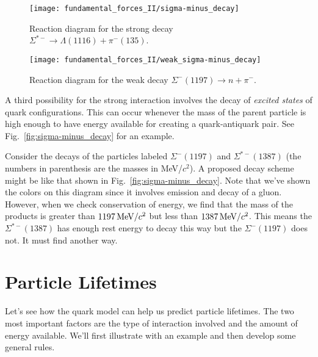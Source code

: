 \begin{figure}[tbp]
\begin{minipage}{6cm}
\begin{center}
\texttt{[image: fundamental\_forces\_II/sigma-minus\_decay]}
\caption{Reaction diagram for the strong decay $\Sigma^{\ast -} \to
  \Lambda(1116) + \pi^-(135)$.}
\label{fig:sigma-minus_decay}
\end{center}
\end{minipage}
\hfill
\begin{minipage}{6cm}
\begin{center}
\texttt{[image: fundamental\_forces\_II/weak\_sigma-minus\_decay]}
\caption{Reaction diagram for the weak decay $\Sigma^-(1197) \to n +
  \pi^-$.}
\label{fig:weak_sigma-minus_decay}
\end{center}
\end{minipage}
\end{figure}


A third possibility for the strong interaction involves the decay of
{\em excited states} of quark configurations.  This can occur whenever
the mass of the parent particle is high enough to have energy
available for creating a quark-antiquark pair.  See
Fig.~\ref{fig:sigma-minus_decay} for an example.

Consider the decays of the particles labeled $\Sigma^-(1197)$ and
$\Sigma^{*-}(1387)$ (the numbers in parenthesis are the masses in
MeV/$c^2$).  A proposed decay scheme might be like that shown in
Fig.~\ref{fig:sigma-minus_decay}.  Note that we've shown the
colors on this diagram since it involves emission and decay of a
gluon. However, when we check conservation of energy, we find that
the mass of the products is greater than $1197\,\mbox{MeV/$c^2$}$ but less
than $1387\,\mbox{MeV/$c^2$}$.  This means the $\Sigma^{*-}(1387)$ has 
enough rest energy to decay this way but the $\Sigma^-(1197)$ does not.
It must find another way.

\section{Particle Lifetimes}

Let's see how the quark model can help us predict particle lifetimes.
The two most important factors are the type of interaction involved
and the amount of energy available.  We'll first illustrate with an
example and then develop some general rules.

